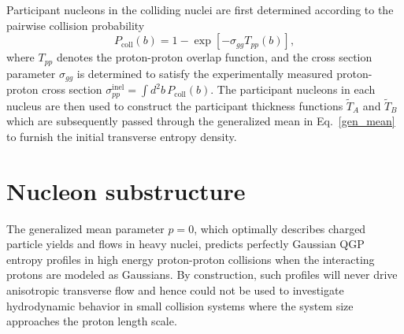 \documentclass[3p,times,procedia]{elsarticle}
\newcommand{\sig}{\sigma^\mathrm{inel}_{pp}}
\newcommand{\T}{\tilde{T}}
\begin{document}
Participant nucleons in the colliding nuclei are first determined according to the pairwise collision probability
\begin{equation}
  \label{collision_criteria}
  P_\mathrm{coll}(b) = 1 - \exp[-\sigma_{gg} T_{pp}(b)],
\end{equation}
where $T_{pp}$ denotes the proton-proton overlap function, and the cross section parameter $\sigma_{gg}$ is determined to satisfy the experimentally measured proton-proton cross section $\sig = \int d^2b\, P_\mathrm{coll}(b)$.
The participant nucleons in each nucleus are then used to construct the participant thickness functions $\T_A$ and $\T_B$ which are subsequently passed through the generalized mean in Eq.~\eqref{gen_mean} to furnish the initial transverse entropy density.


\section{Nucleon substructure}
\label{}

The generalized mean parameter $p=0$, which optimally describes charged particle yields and flows in heavy nuclei, predicts perfectly Gaussian QGP entropy profiles in high energy proton-proton collisions when the interacting protons are modeled as Gaussians. 
By construction, such profiles will never drive anisotropic transverse flow and hence could not be used to investigate hydrodynamic behavior in small collision systems where the system size approaches the proton length scale.
\end{document}

